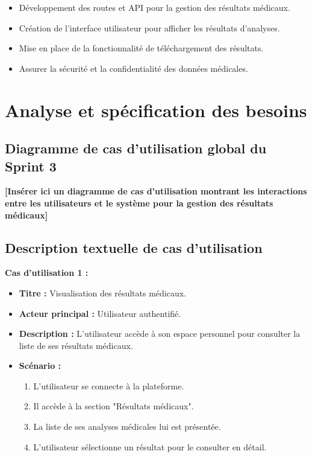 \documentclass[12pt,a4paper]{report}
\begin{document}
\begin{itemize}
    \item Développement des routes et API pour la gestion des résultats médicaux.
    \item Création de l'interface utilisateur pour afficher les résultats d'analyses.
    \item Mise en place de la fonctionnalité de téléchargement des résultats.
    \item Assurer la sécurité et la confidentialité des données médicales.
\end{itemize}

\section{Analyse et spécification des besoins}

\subsection{Diagramme de cas d’utilisation global du Sprint 3}

\textbf{[Insérer ici un diagramme de cas d’utilisation montrant les interactions entre les utilisateurs et le système pour la gestion des résultats médicaux]}

\subsection{Description textuelle de cas d’utilisation}

\textbf{Cas d’utilisation 1 :}

\begin{itemize}
    \item \textbf{Titre :} Visualisation des résultats médicaux.
    \item \textbf{Acteur principal :} Utilisateur authentifié.
    \item \textbf{Description :} L'utilisateur accède à son espace personnel pour consulter la liste de ses résultats médicaux.
    \item \textbf{Scénario :}
    \begin{enumerate}
        \item L'utilisateur se connecte à la plateforme.
        \item Il accède à la section "Résultats médicaux".
        \item La liste de ses analyses médicales lui est présentée.
        \item L'utilisateur sélectionne un résultat pour le consulter en détail.
    \end{enumerate}
\end{itemize}
\end{document}
